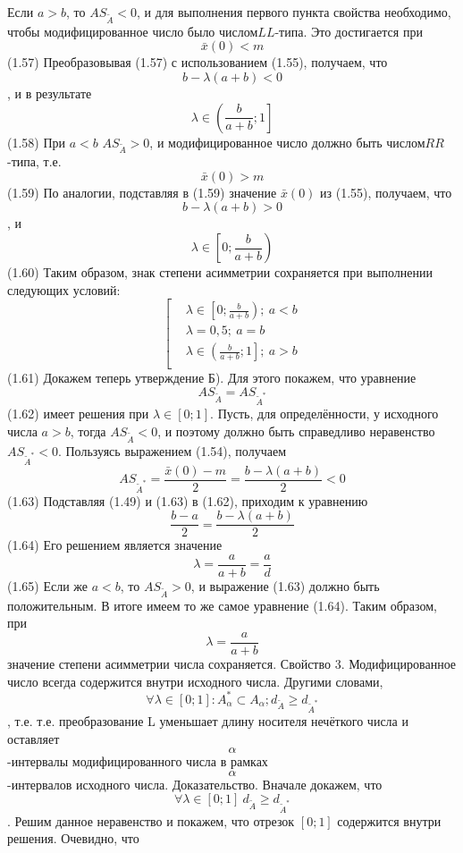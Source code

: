 Если $a>b$, то $A{{S}_{{\tilde{A}}}}<0$, и для выполнения первого пункта свойства необходимо, чтобы модифицированное число было числом$LL$-типа. Это достигается при 
	\[\bar{x}\left( 0 \right)<m\] 	(1.57)
Преобразовывая (1.57) с использованием (1.55), получаем, что \[b-\lambda \left( a+b \right)<0\], и в результате 
	\[\lambda \in \left( \frac{b}{a+b};1 \right]\] 	(1.58)
При $a<b$ $A{{S}_{{\tilde{A}}}}>0$, и модифицированное число должно быть числом$RR$-типа, т.е. 
	\[\bar{x}\left( 0 \right)>m\] 	(1.59)
По аналогии, подставляя в (1.59) значение $\bar{x}\left( 0 \right)$ из (1.55), получаем, что \[b-\lambda \left( a+b \right)>0\], и 
	\[\lambda \in \left[ 0;\frac{b}{a+b} \right)\] 	(1.60)
Таким образом, знак степени асимметрии сохраняется при выполнении следующих условий:
	\[\left[ \begin{aligned}
  & \lambda \in \left[ 0;\frac{b}{a+b} \right);\ a<b \\ 
 & \lambda =0,5;\ a=b \\ 
 & \lambda \in \left( \frac{b}{a+b};1 \right];\ a>b \\ 
\end{aligned} \right.\] 	(1.61)
Докажем теперь утверждение Б). Для этого покажем, что уравнение
	\[A{{S}_{{\tilde{A}}}}=A{{S}_{{{{\tilde{A}}}^{*}}}}\] 	(1.62)
имеет решения при $\lambda \in \left[ 0;1 \right]$. Пусть, для определённости, у исходного числа $a>b$, тогда $A{{S}_{{\tilde{A}}}}<0$, и поэтому должно быть справедливо неравенство$A{{S}_{{{{\tilde{A}}}^{*}}}}<0$. Пользуясь выражением (1.54), получаем
	\[A{{S}_{{{{\tilde{A}}}^{*}}}}=\frac{\bar{x}\left( 0 \right)-m}{2}=\frac{b-\lambda \left( a+b \right)}{2}<0\] 	(1.63)
Подставляя (1.49) и (1.63) в (1.62), приходим к уравнению
	\[\frac{b-a}{2}=\frac{b-\lambda \left( a+b \right)}{2}\] 	(1.64)
Его решением является значение
	\[\lambda =\frac{a}{a+b}=\frac{a}{d}\] 	(1.65)
Если же $a<b$, то $A{{S}_{{\tilde{A}}}}>0$, и выражение (1.63) должно быть положительным. В итоге имеем то же самое уравнение (1.64).
Таким образом, при \[\lambda =\frac{a}{a+b}\] значение степени асимметрии числа сохраняется.
Свойство 3. Модифицированное число всегда содержится внутри исходного числа. Другими словами, \[\forall \lambda \in \left[ 0;1 \right]:A_{\alpha }^{*}\subset {{A}_{\alpha }};{{d}_{{\tilde{A}}}}\ge {{d}_{{{{\tilde{A}}}^{*}}}}\], т.е. т.е. преобразование L уменьшает длину носителя нечёткого числа и оставляет \[\alpha \]-интервалы модифицированного числа в рамках \[\alpha \]-интервалов исходного числа.
Доказательство. Вначале докажем, что \[\forall \lambda \in \left[ 0;1 \right]\ {{d}_{{\tilde{A}}}}\ge {{d}_{{{{\tilde{A}}}^{*}}}}\]. Решим данное неравенство и покажем, что отрезок $\left[ 0;1 \right]$ содержится внутри решения. Очевидно, что 
